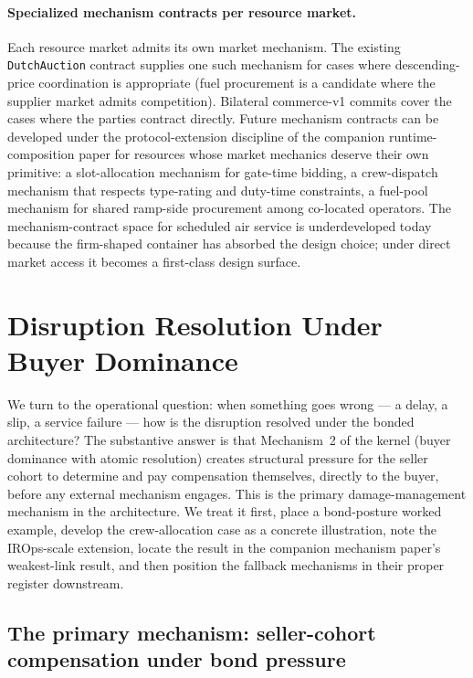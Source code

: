 \documentclass[11pt,a4paper]{article}
\theoremstyle{definition}
\theoremstyle{remark}
\begin{document}
\paragraph{Specialized mechanism contracts per resource market.}
Each resource market admits its own market mechanism. The
existing \texttt{DutchAuction} contract supplies one such
mechanism for cases where descending-price coordination is
appropriate (fuel procurement is a candidate where the supplier
market admits competition). Bilateral commerce-v1 commits cover
the cases where the parties contract directly. Future mechanism
contracts can be developed under the protocol-extension
discipline of the companion runtime-composition paper for
resources whose market mechanics deserve their own primitive: a
slot-allocation mechanism for gate-time bidding, a crew-dispatch
mechanism that respects type-rating and duty-time constraints, a
fuel-pool mechanism for shared ramp-side procurement among
co-located operators. The mechanism-contract space for scheduled
air service is underdeveloped today because the firm-shaped
container has absorbed the design choice; under direct market
access it becomes a first-class design surface.

\section{Disruption Resolution Under Buyer Dominance}
\label{sec:disruption}

We turn to the operational question: when something goes wrong
--- a delay, a slip, a service failure --- how is the disruption
resolved under the bonded architecture? The substantive answer is
that Mechanism~2 of the kernel (buyer dominance with atomic
resolution) creates structural pressure for the seller cohort to
determine and pay compensation themselves, directly to the buyer,
before any external mechanism engages. This is the primary
damage-management mechanism in the architecture. We treat it
first, place a bond-posture worked example, develop the
crew-allocation case as a concrete illustration, note the
IROps-scale extension, locate the result in the companion
mechanism paper's weakest-link result, and then position the
fallback mechanisms in their proper register downstream.

\subsection{The primary mechanism: seller-cohort compensation under bond pressure}
\end{document}
